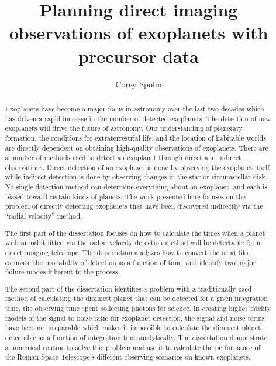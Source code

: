 \documentclass[phd,tocprelim]{cornell}
\title {Planning direct imaging observations of exoplanets with precursor data}
\author {Corey Spohn}
\begin{document}
\maketitle
\makecopyright

\begin{abstract}
Exoplanets have become a major focus in astronomy over the last two decades which has
driven a rapid increase in the number of detected exoplanets. The detection of new
exoplanets will drive the future of astronomy. Our understanding of planetary
formation, the conditions for extraterrestrial life, and the location of
habitable worlds are directly dependent on obtaining high-quality observations
of exoplanets. There are a number of methods used to detect an exoplanet
through direct and indirect observations. Direct detection of an exoplanet is
done by observing the exoplanet itself, while indirect detection is done by
observing changes in the star or circumstellar disk. No single detection method can determine
everything about an exoplanet, and each is biased toward certain kinds of
planets. The work presented here focuses on the problem of directly
detecting exoplanets that have been discovered indirectly 
via the ``radial velocity'' method.

The first part of the dissertation focuses on how to calculate the times when a
planet with an orbit fitted via the radial velocity detection method will be
detectable for a direct imaging telescope. The dissertation analyzes how to convert the orbit
fits, estimate the probability of detection as a function of time, and identify
two major failure modes inherent to the process.

The second part of the dissertation identifies a problem with a traditionally
used method of calculating the dimmest planet that can be detected for a given
integration time, the observing time spent collecting photons for science. In
creating higher fidelity models of the signal to noise ratio for exoplanet
detection, the signal and noise terms have become inseparable which makes it
impossible to calculate the dimmest planet detectable as a function of
integration time analytically. The dissertation demonstrate a numerical routine
to solve this problem and use it to calculate the performance of the Roman
Space Telescope's different observing scenarios on known exoplanets.


\end{abstract}
\end{document}

